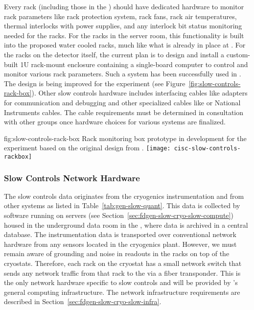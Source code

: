 Every rack (including those in the ) should have dedicated hardware to monitor rack parameters like rack protection system, rack fans, rack air temperatures, thermal interlocks with power supplies, and any interlock bit status monitoring needed for the racks. For the racks in the  server room, this functionality is built into the proposed water cooled racks, much like what is already in place at .  For the racks on the detector itself, the current plan is to design and install a custom-built 1U rack-mount enclosure containing a single-board computer to control and monitor various rack parameters. Such a system has been successfully used in . The design is being improved for the  experiment (see Figure~\ref{fig:slow-controls-rack-box}). Other slow controls hardware includes interfacing cables like adapters for communication and debugging and other specialized cables like  
or National Instruments cables. The cable requirements must be determined in consultation with other groups once hardware choices for various systems are finalized.

\begin{dunefigure}{fig:slow-controls-rack-box}
{Rack monitoring box prototype in development for the  experiment based on the original design from .}
\texttt{[image: cisc-slow-controls-rackbox]}
\end{dunefigure}


\subsubsection{Slow Controls Network Hardware}
\label{sec:fdgen-slow-cryo-slow-network}
The slow controls data originates from the cryogenics instrumentation and from other systems as listed in Table~\ref{tab:gen-slow-quant}. This data is collected by software running on servers
(see Section~\ref{sec:fdgen-slow-cryo-slow-compute})
housed in the underground data room in the ,
where data is archived in a central  database.
The instrumentation data is transported over
conventional network hardware from any sensors located in the cryogenics
plant.  However, we must remain aware of grounding and noise in readouts in the racks on top of the
cryostats.  Therefore, each
rack on the cryostat has a small network switch that sends
any network traffic from that rack to the  via a fiber transponder.
This is the only network hardware specific to slow controls and will be provided by %
's   
general computing infrastructure. %
The network infrastructure requirements are described in
Section~\ref{sec:fdgen-slow-cryo-slow-infra}.

